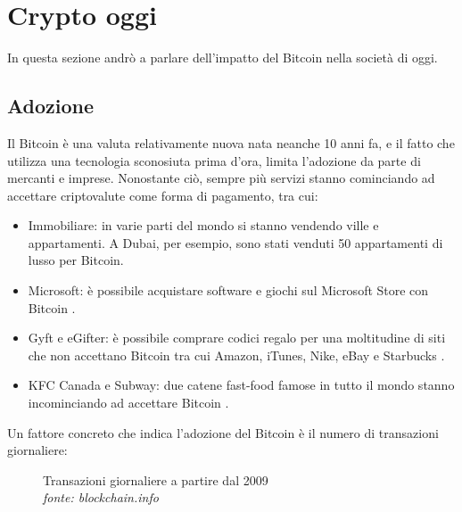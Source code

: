 \documentclass {article}
\begin{document}
\newpage


\section {Crypto oggi}


In questa sezione andrò a parlare dell'impatto del Bitcoin nella società di oggi.


\subsection {Adozione}


Il Bitcoin è una valuta relativamente nuova nata neanche 10 anni fa, e il fatto che utilizza una tecnologia sconosiuta prima d'ora, limita l'adozione da parte di mercanti e imprese.
Nonostante ciò, sempre più servizi stanno cominciando ad accettare criptovalute come forma di pagamento, tra cui:

\begin{itemize}
\item Immobiliare: in varie parti del mondo si stanno vendendo ville e appartamenti. A Dubai, per esempio, sono stati venduti 50 appartamenti di lusso per Bitcoin\cite{dubai}.
\item Microsoft: è possibile acquistare software e giochi sul Microsoft Store con Bitcoin \cite{accepting}.
\item Gyft e eGifter: è possibile comprare codici regalo per una moltitudine di siti che non accettano Bitcoin tra cui Amazon, iTunes, Nike, eBay e Starbucks \cite{accepting}. 
\item KFC Canada e Subway: due catene fast-food famose in tutto il mondo stanno incominciando ad accettare Bitcoin \cite{accepting}. 
\end{itemize}

Un fattore concreto che indica l'adozione del Bitcoin è il numero di transazioni giornaliere:

\vspace {0.5cm}
\begin{figure}[htb!]
\caption {Transazioni giornaliere a partire dal 2009\\\textit{fonte: blockchain.info}}
\end{figure}
\vspace {0.2cm}
\noindent
%
\end{document}
